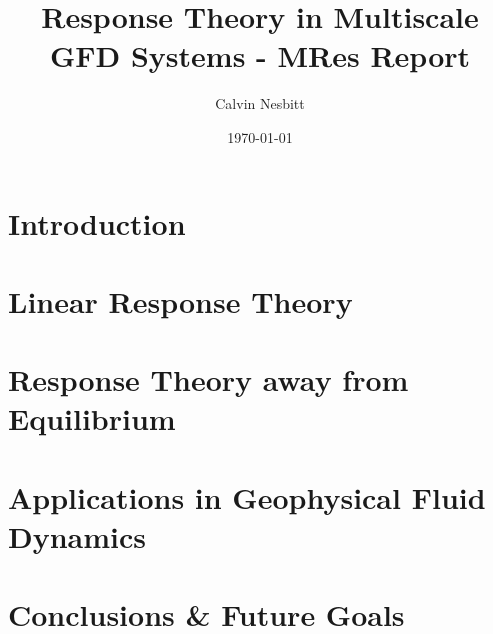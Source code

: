\documentclass[11pt,letterpaper,oneside]{report}
\title{Response Theory in Multiscale GFD Systems - MRes Report}
\date{\today}
\author{Calvin Nesbitt}
\begin{document}
\maketitle 

\tableofcontents 

\cleardoublepage

\chapter{Introduction}

\chapter{Linear Response Theory} \label{Chapter:LRT}





\chapter{Response Theory away from Equilibrium}





\chapter{Applications in Geophysical Fluid Dynamics} \label{Chapter Applications}




\chapter{Conclusions \& Future Goals}

\clearpage 

\end{document}

